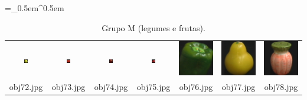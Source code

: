 \begin{table}[H]
  \centering
  \caption{Grupo M (legumes e frutas).}
  \tabulinesep =_0.5em^0.5em
  \everyrow{\tabucline[0.4pt]-}
  \begin{tabu}{|ccccccc|}
    \includegraphics[width=0.1\textwidth,height=0.1\textwidth]{imagens/coil_100/legumes_frutas/obj2__0.png} &
    \includegraphics[width=0.1\textwidth,height=0.1\textwidth]{imagens/coil_100/legumes_frutas/obj4__0.png} &
    \includegraphics[width=0.1\textwidth,height=0.1\textwidth]{imagens/coil_100/legumes_frutas/obj63__0.png} &
    \includegraphics[width=0.1\textwidth,height=0.1\textwidth]{imagens/coil_100/legumes_frutas/obj75__0.png} &
    \includegraphics[width=0.1\linewidth,height=0.1\linewidth]{imagens/coil_100/legumes_frutas/obj82__0.png} &
    \includegraphics[width=0.1\linewidth,height=0.1\linewidth]{imagens/coil_100/legumes_frutas/obj83__0.png} &
    \includegraphics[width=0.1\linewidth,height=0.1\linewidth]{imagens/coil_100/legumes_frutas/obj86__0.png}
    \\
    \scriptsize{obj72.jpg} & \scriptsize{obj73.jpg} & \scriptsize{obj74.jpg} &
    \scriptsize{obj75.jpg} & \scriptsize{obj76.jpg} & \scriptsize{obj77.jpg} &
    \scriptsize{obj78.jpg}
  \end{tabu}
\end{table}

